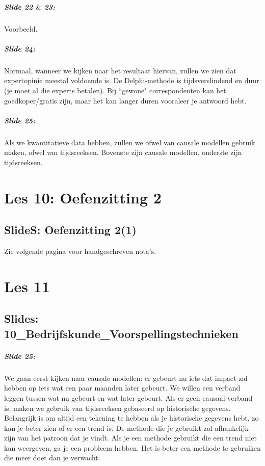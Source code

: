 \documentclass[10pt,a4paper]{report}
\begin{document}
\paragraph{Slide 22 $\&$ 23:} Voorbeeld.

\paragraph{Slide 24:} Normaal, wanneer we kijken naar het resultaat hiervan, zullen we zien dat expertopinie meestal voldoende is. De Delphi-methode is tijdsverslindend en duur (je moet al die experts betalen). Bij ``gewone" correspondenten kan het goedkoper/gratis zijn, maar het kan langer duren vooraleer je antwoord hebt. 

\paragraph{Slide 25:} Als we kwantitatieve data hebben, zullen we ofwel van causale modellen gebruik maken, ofwel van tijdsreeksen. Bovenste zijn causale modellen, onderste zijn tijdsreeksen.

\chapter{Les 10: Oefenzitting 2}
\section{SlideS: Oefenzitting 2(1)}
Zie volgende pagina voor handgeschreven nota's.

 

\chapter{Les 11}

\section{Slides: 10\_Bedrijfskunde\_Voorspellingstechnieken}

\paragraph{Slide 25:} We gaan eerst kijken naar causale modellen: er gebeurt nu iets dat impact zal hebben op iets wat een paar maanden later gebeurt. We willen een verband leggen tussen wat nu gebeurt en wat later gebeurt.
Als er geen causaal verband is, maken we gebruik van tijdsreeksen gebaseerd op historische gegevens.\\
Belangrijk is om altijd een tekening te hebben als je historische gegevens hebt, zo kan je beter zien of er een trend is. De methode die je gebruikt zal afhankelijk zijn van het patroon dat je vindt. Als je een methode gebruikt die een trend niet kan weergeven, ga je een probleem hebben. Het is beter een methode te gebruiken die meer doet dan je verwacht. 
\end{document}
